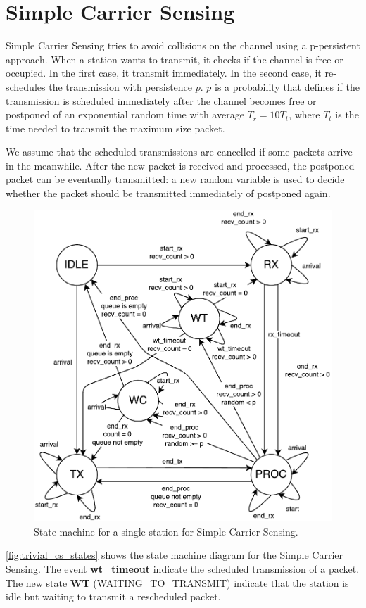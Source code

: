 \section{Simple Carrier Sensing}
\label{sec:simple}

Simple Carrier Sensing tries to avoid collisions on the channel using a p-persistent approach.
When a station wants to transmit, it checks if the channel is free or occupied.
In the first case, it transmit immediately.
In the second case, it re-schedules the transmission with persistence $p$. $p$ is a probability that defines if the transmission is scheduled immediately after the channel becomes free or postponed of an exponential random time with average $T_r = 10T_t$, where $T_t$ is the time needed to transmit the maximum size packet.

We assume that the scheduled transmissions are cancelled if some packets arrive in the meanwhile.
After the new packet is received and processed, the postponed packet can be eventually transmitted: a new random variable is used to decide whether the packet should be transmitted immediately of postponed again.

\begin{figure}[ht]
	\centering
	\includegraphics[width=\columnwidth]{figures/states/simple}
	\caption{State machine for a single station for Simple Carrier Sensing.}
	\label{fig:simple_cs_states}
\end{figure}

\cref{fig:trivial_cs_states} shows the state machine diagram for the Simple Carrier Sensing.
The event \textbf{wt\_timeout} indicate the scheduled transmission of a packet.
The new state \textbf{WT} (WAITING\_TO\_TRANSMIT) indicate that the station is idle but waiting to transmit a rescheduled packet.

